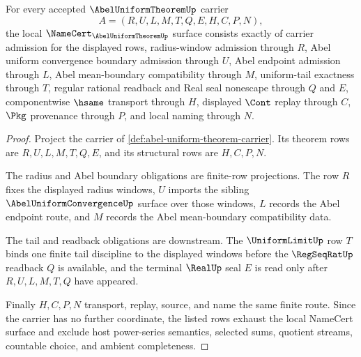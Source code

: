 \begin{theorem}
\label{thm:abel-uniform-theorem-namecert-obligations}
For every accepted $\AbelUniformTheoremUp$ carrier
$$
A=(R,U,L,M,T,Q,E,H,C,P,N),
$$
the local $\NameCert_{\AbelUniformTheoremUp}$ surface consists exactly of carrier admission for the displayed rows, radius-window admission through $R$, Abel uniform convergence boundary admission through $U$, Abel endpoint admission through $L$, Abel mean-boundary compatibility through $M$, uniform-tail exactness through $T$, regular rational readback and Real seal nonescape through $Q$ and $E$, componentwise $\hsame$ transport through $H$, displayed $\Cont$ replay through $C$, $\Pkg$ provenance through $P$, and local naming through $N$.
\end{theorem}
\begin{proof}
Project the carrier of \autoref{def:abel-uniform-theorem-carrier}. Its theorem rows are $R,U,L,M,T,Q,E$, and its structural rows are $H,C,P,N$.

The radius and Abel boundary obligations are finite-row projections. The row $R$ fixes the displayed radius windows, $U$ imports the sibling $\AbelUniformConvergenceUp$ surface over those windows, $L$ records the Abel endpoint route, and $M$ records the Abel mean-boundary compatibility data.

The tail and readback obligations are downstream. The $\UniformLimitUp$ row $T$ binds one finite tail discipline to the displayed windows before the $\RegSeqRatUp$ readback $Q$ is available, and the terminal $\RealUp$ seal $E$ is read only after $R,U,L,M,T,Q$ have appeared.

Finally $H,C,P,N$ transport, replay, source, and name the same finite route. Since the carrier has no further coordinate, the listed rows exhaust the local NameCert surface and exclude host power-series semantics, selected sums, quotient streams, countable choice, and ambient completeness.
\end{proof}

